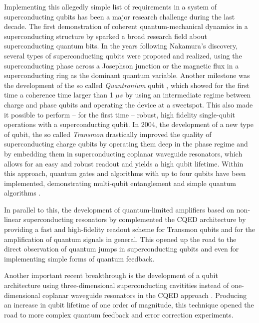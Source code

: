 Implementing this allegedly simple list of requirements in a system of superconducting qubits has been a major research challenge during the last decade. The first demonstration of coherent quantum-mechanical dynamics in a superconducting structure by \cite{nakamura_coherent_1999} sparked a broad research field about superconducting quantum bits. In the years following Nakamura's discovery, several types of superconducting qubits were proposed and realized, using the superconducting phase \citep{martinis_energy-level_1985,martinis_rabi_2002} across a Josephson junction or the magnetic flux \citep{mooij_josephson_1999,chiorescu_coherent_2003} in a superconducting ring as the dominant quantum variable. Another milestone was the development of the so called {\it Quantronium} qubit \citep{vion_manipulating_2002}, which showed for the first time a coherence time larger than 1 $\mu s$ by using an intermediate regime between charge and phase qubits and operating the device at a sweetspot. This also made it possible to perform -- for the first time -- robust, high fidelity single-qubit operations with a superconducting qubit. In 2004, the development of a new type of qubit, the so called {\it Transmon} \citep{wallraff_strong_2004} drastically improved the quality of superconducting charge qubits by operating them deep in the phase regime and by embedding them in superconducting coplanar waveguide resonators, which allows for an easy and robust readout and yields a high qubit lifetime. Within this approach, quantum gates and algorithms with up to four qubits have been implemented, demonstrating multi-qubit entanglement \citep{dicarlo_preparation_2010} and simple quantum algorithms \citep{dicarlo_demonstration_2009}.

In parallel to this, the development of quantum-limited amplifiers based on non-linear superconducting resonators by \cite{siddiqi_rf-driven_2004} complemented the CQED architecture by providing a fast and high-fidelity readout scheme for Transmon qubits \citep{siddiqi_dispersive_2006,mallet_single-shot_2009} and for the amplification of quantum signals in general. This opened up the road to the direct observation of quantum jumps in superconducting qubits \citep{vijay_observation_2011} and even for implementing simple forms of quantum feedback. 

Another important recent breakthrough is the development of a qubit architecture using three-dimensional superconducting cavitities instead of one-dimensional coplanar waveguide resonators in the CQED approach \cite{paik_observation_2011}. Producing an increase in qubit lifetime of one order of magnitude, this technique opened the road to more complex quantum feedback and error correction experiments.

